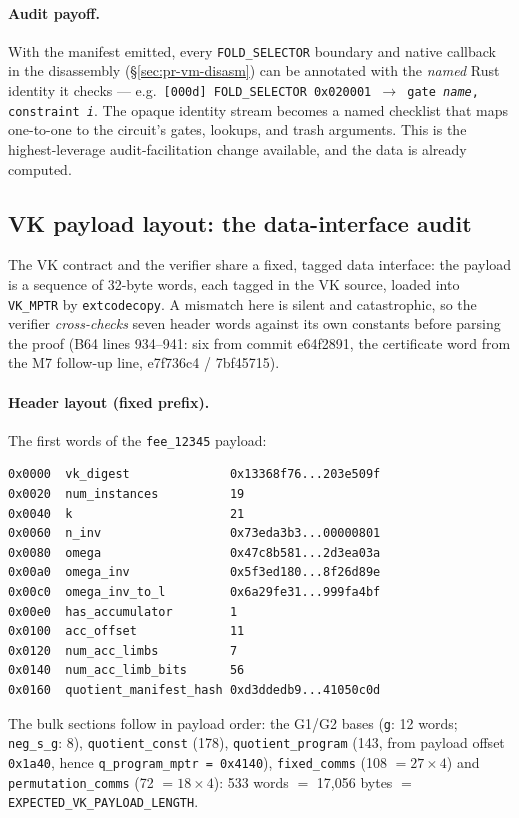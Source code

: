 \paragraph{Audit payoff.} With the manifest emitted, every
\texttt{FOLD\_SELECTOR} boundary and native callback in the
disassembly (\S\ref{sec:pr-vm-disasm}) can be annotated with the
\emph{named} Rust identity it checks --- e.g.\
\texttt{[000d] FOLD\_\allowbreak{}SELECTOR 0x020001 $\to$ gate \emph{name},
constraint \emph{i}}. The opaque identity stream becomes a named checklist
that maps one-to-one to the circuit's gates, lookups, and trash
arguments. This is the highest-leverage audit-facilitation change
available, and the data is already computed.

\subsection{VK payload layout: the data-interface audit}
\label{sec:pr-vk-payload}

The VK contract and the verifier share a fixed, tagged data interface:
the payload is a sequence of 32-byte words, each tagged in the VK
source, loaded into \texttt{VK\_MPTR} by \texttt{extcodecopy}. A
mismatch here is silent and catastrophic, so the verifier
\emph{cross-checks} seven header words against its own constants before
parsing the proof (B64 lines 934--941: six from commit e64f2891, the
certificate word from the M7 follow-up line, e7f736c4 / 7bf45715).

\paragraph{Header layout (fixed prefix).} The first words of the
\texttt{fee\_12345} payload:
\begin{lstlisting}[style=plain]
0x0000  vk_digest              0x13368f76...203e509f
0x0020  num_instances          19
0x0040  k                      21
0x0060  n_inv                  0x73eda3b3...00000801
0x0080  omega                  0x47c8b581...2d3ea03a
0x00a0  omega_inv              0x5f3ed180...8f26d89e
0x00c0  omega_inv_to_l         0x6a29fe31...999fa4bf
0x00e0  has_accumulator        1
0x0100  acc_offset             11
0x0120  num_acc_limbs          7
0x0140  num_acc_limb_bits      56
0x0160  quotient_manifest_hash 0xd3ddedb9...41050c0d
\end{lstlisting}
The bulk sections follow in payload order: the G1/G2 bases
(\texttt{g}: 12 words; \texttt{neg\_s\_g}: 8), \texttt{quotient\_const}
(178), \texttt{quotient\_program} (143, from payload offset
\texttt{0x1a40}, hence \texttt{q\_\allowbreak{}program\_\allowbreak{}mptr = 0x4140}),
\texttt{fixed\_comms} (108 $=27\times4$) and
\texttt{permutation\_\allowbreak{}comms} (72 $=18\times4$): 533 words $=$ 17{,}056
bytes $=$ \texttt{EXPECTED\_\allowbreak{}VK\_\allowbreak{}PAYLOAD\_\allowbreak{}LENGTH}.

